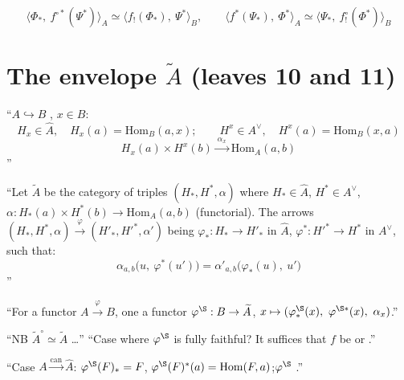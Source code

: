 \documentclass[11pt,a4paper]{article}
\begin{document}
\[
\bigl\langle \Phi_{*},\ f^{\circ*}(\Psi^{*}) \bigr\rangle_{A}
\simeq \bigl\langle f_{!}(\Phi_{*}),\ \Psi^{*} \bigr\rangle_{B},
\qquad
\bigl\langle f^{*}(\Psi_{*}),\ \Phi^{*} \bigr\rangle_{A}
\simeq \bigl\langle \Psi_{*},\ f^{\circ}_{!}(\Phi^{*}) \bigr\rangle_{B}
\]

\section*{The envelope $\widetilde{A}$ (leaves 10 and 11)}

``$A \hookrightarrow B$ , $x \in B$:
\[
H_{x} \in \widehat{A}, \quad H_{x}(a) = \mathrm{Hom}_{B}(a, x) ;
\qquad
H^{x} \in A^{\vee}, \quad H^{x}(a) = \mathrm{Hom}_{B}(x, a)
\]
\[
H_{x}(a) \times H^{x}(b) \xrightarrow{\ \alpha_{x}\ } \mathrm{Hom}_{A}(a, b)
\]
''

``Let $\widetilde{A}$ be the category of triples $(H_{*}, H^{*}, \alpha)$
where $H_{*} \in \widehat{A}$, $H^{*} \in A^{\vee}$,
$\alpha : H_{*}(a) \times H^{*}(b) \to \mathrm{Hom}_{A}(a,b)$ (functorial).
The arrows $(H_{*}, H^{*}, \alpha) \xrightarrow{\varphi}
(H'_{*}, H'^{*}, \alpha')$ being 
$\varphi_{*} : H_{*} \to H'_{*}$ in $\widehat{A}$,
$\varphi^{*} : H'^{*} \to H^{*}$ in $A^{\vee}$, such that:
\[
\alpha_{a,b}\bigl(u,\ \varphi^{*}(u')\bigr)
= \alpha'_{a,b}\bigl(\varphi_{*}(u),\ u'\bigr)
\]
''

``For a  functor $A \xrightarrow{\varphi} B$, one
 a functor $\varphi^{\S} : B \to \widetilde{A}$,
$x \mapsto (\varphi^{\S}_{*}(x),\ \varphi^{\S *}(x),\ \alpha_{x})$.''

``NB $\widetilde{A}^{\circ} \simeq \widetilde{A}$ \ldots''
``Case where $\varphi^{\S}$ is fully faithful? It suffices that $f$ be
 or \ill{} .''

``Case $A \xrightarrow{\mathrm{can}} \widehat{A}$:
$\varphi^{\S}(F)_{*} = F$,\quad
$\varphi^{\S}(F)^{*}(a) = \mathrm{Hom}(F, a)$;\quad $\varphi^{\S}$
.''
\end{document}
